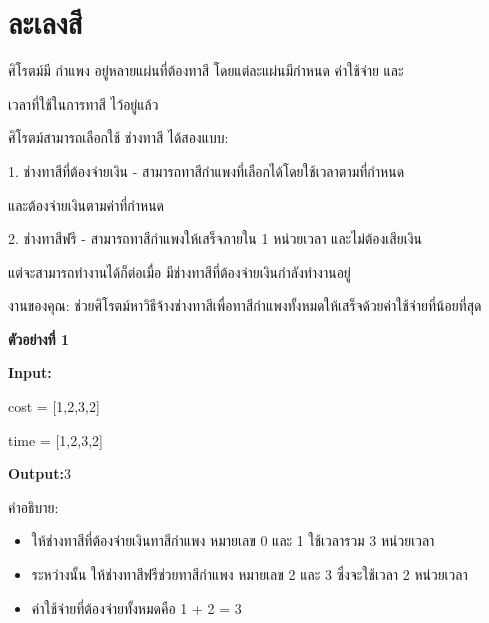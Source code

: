 \documentclass{article}
\begin{document}
\section*{ละเลงสี}

ศิโรตม์มี กำแพง อยู่หลายแผ่นที่ต้องทาสี โดยแต่ละแผ่นมีกำหนด ค่าใช้จ่าย และ

เวลาที่ใช้ในการทาสี ไว้อยู่แล้ว



ศิโรตม์สามารถเลือกใช้ ช่างทาสี ได้สองแบบ:



1. ช่างทาสีที่ต้องจ่ายเงิน - สามารถทาสีกำแพงที่เลือกได้โดยใช้เวลาตามที่กำหนด

และต้องจ่ายเงินตามค่าที่กำหนด



2. ช่างทาสีฟรี - สามารถทาสีกำแพงให้เสร็จภายใน 1 หน่วยเวลา และไม่ต้องเสียเงิน

แต่จะสามารถทำงานได้ก็ต่อเมื่อ มีช่างทาสีที่ต้องจ่ายเงินกำลังทำงานอยู่



งานของคุณ: ช่วยศิโรตม์หาวิธีจ้างช่างทาสีเพื่อทาสีกำแพงทั้งหมดให้เสร็จด้วยค่าใช้จ่ายที่น้อยที่สุด



\textbf{ตัวอย่างที่ 1}



\textbf{Input:}



cost = {[}1,2,3,2{]}



time = {[}1,2,3,2{]}



\textbf{Output:}3



คำอธิบาย:



\begin{itemize}

\tightlist

\item

  ให้ช่างทาสีที่ต้องจ่ายเงินทาสีกำแพง หมายเลข 0 และ 1 ใช้เวลารวม 3 หน่วยเวลา

\item

  ระหว่างนั้น ให้ช่างทาสีฟรีช่วยทาสีกำแพง หมายเลข 2 และ 3 ซึ่งจะใช้เวลา 2 หน่วยเวลา

\item

  ค่าใช้จ่ายที่ต้องจ่ายทั้งหมดคือ 1 + 2 = 3

\end{itemize}
\end{document}
